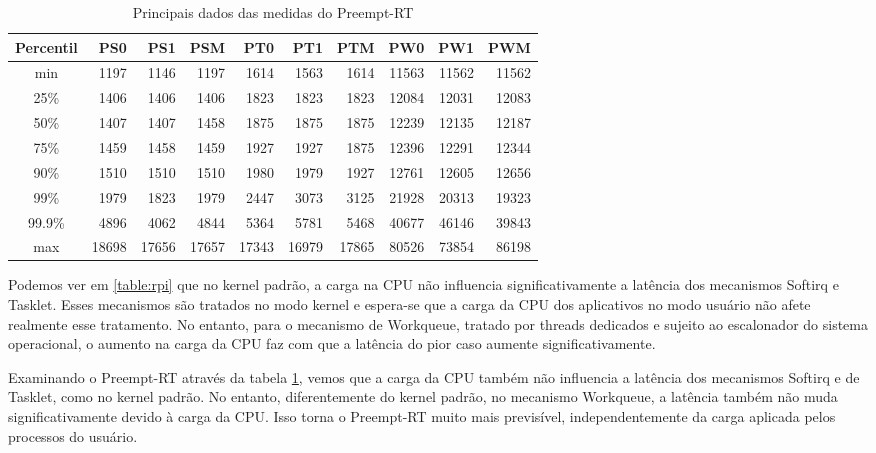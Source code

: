 \begin{table}[!p]
\centering
\begin{center}
\begin{tabular}{|c|r|r|r|r|r|r|r|r|r|}
\toprule
Percentil &    PS0 &    PS1 &    PSM &    PT0 &    PT1 &    PTM &    PW0 &     PW1 &    PWM \\
\midrule
  min &   1197 &   1146 &   1197 &   1614 &   1563 &   1614 &  11563 &  11562 &  11562 \\
  25\% &   1406 &   1406 &   1406 &   1823 &   1823 &   1823 &  12084 &  12031 &  12083 \\
  50\% &   1407 &   1407 &   1458 &   1875 &   1875 &   1875 &  12239 &  12135 &  12187 \\
  75\% &   1459 &   1458 &   1459 &   1927 &   1927 &   1875 &  12396 &  12291 &  12344 \\
  90\% &   1510 &   1510 &   1510 &   1980 &   1979 &   1927 &  12761 &  12605 &  12656 \\
  99\% &   1979 &   1823 &   1979 &   2447 &   3073 &   3125 &  21928 &  20313 &  19323 \\
99.9\% &   4896 &   4062 &   4844 &   5364 &   5781 &   5468 &  40677 &  46146 &  39843 \\
max &  18698 &  17656 &  17657 &  17343 &  16979 &  17865 &  80526 &  73854 &  86198 \\
\bottomrule
\end{tabular}
\end{center}
\caption{Principais dados das medidas do Preempt-RT}
\label{table:prt}
\end{table}

Podemos ver em \ref{table:rpi} que no kernel padrão, a carga na CPU não influencia significativamente a latência dos mecanismos Softirq e Tasklet. Esses mecanismos são tratados no modo kernel e espera-se que a carga da CPU dos aplicativos no modo usuário não afete realmente esse tratamento. No entanto, para o mecanismo de Workqueue, tratado por threads dedicados e sujeito ao escalonador do sistema operacional, o aumento na carga da CPU faz com que a latência do pior caso aumente significativamente.

Examinando o Preempt-RT através da tabela \ref{table:prt}, vemos que a carga da CPU também não influencia a latência dos mecanismos Softirq e de Tasklet, como no kernel padrão. No entanto, diferentemente do kernel padrão, no mecanismo Workqueue, a latência também não muda significativamente devido à carga da CPU. Isso torna o Preempt-RT muito mais previsível, independentemente da carga aplicada pelos processos do usuário.

